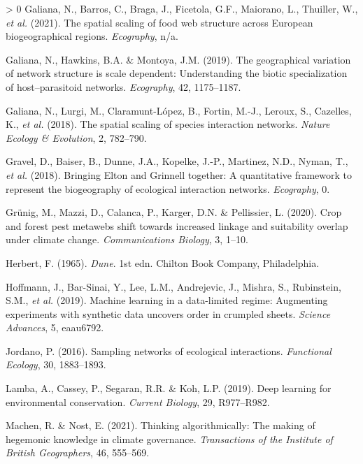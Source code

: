 \documentclass[11pt]{article}
\newlength{\cslhangindent}
\newenvironment{CSLReferences}[3] %
 {%
  \setlength{\parindent}{0pt}
  \ifodd #1 \everypar{\setlength{\hangindent}{\cslhangindent}}\ignorespaces\fi
  \ifnum #2 > 0
  \setlength{\parskip}{#2\baselineskip}
  \fi
 }%
 {}
\begin{document}
\begin{CSLReferences}{1}{0}
\leavevmode\hypertarget{ref-Galiana2021SpaSca}{}%
Galiana, N., Barros, C., Braga, J., Ficetola, G.F., Maiorano, L.,
Thuiller, W., \emph{et al.} (2021). The spatial scaling of food web
structure across European biogeographical regions. \emph{Ecography},
n/a.

\leavevmode\hypertarget{ref-Galiana2019GeoVar}{}%
Galiana, N., Hawkins, B.A. \& Montoya, J.M. (2019). The geographical
variation of network structure is scale dependent: Understanding the
biotic specialization of host--parasitoid networks. \emph{Ecography},
42, 1175--1187.

\leavevmode\hypertarget{ref-Galiana2018SpaSca}{}%
Galiana, N., Lurgi, M., Claramunt-López, B., Fortin, M.-J., Leroux, S.,
Cazelles, K., \emph{et al.} (2018). The spatial scaling of species
interaction networks. \emph{Nature Ecology \& Evolution}, 2, 782--790.

\leavevmode\hypertarget{ref-Gravel2018BriElt}{}%
Gravel, D., Baiser, B., Dunne, J.A., Kopelke, J.-P., Martinez, N.D.,
Nyman, T., \emph{et al.} (2018). Bringing Elton and Grinnell together: A
quantitative framework to represent the biogeography of ecological
interaction networks. \emph{Ecography}, 0.

\leavevmode\hypertarget{ref-Grunig2020CroFor}{}%
Grünig, M., Mazzi, D., Calanca, P., Karger, D.N. \& Pellissier, L.
(2020). Crop and forest pest metawebs shift towards increased linkage
and suitability overlap under climate change. \emph{Communications
Biology}, 3, 1--10.

\leavevmode\hypertarget{ref-Herbert1965Dun}{}%
Herbert, F. (1965). \emph{Dune}. 1st edn. Chilton Book Company,
Philadelphia.

\leavevmode\hypertarget{ref-Hoffmann2019MacLea}{}%
Hoffmann, J., Bar-Sinai, Y., Lee, L.M., Andrejevic, J., Mishra, S.,
Rubinstein, S.M., \emph{et al.} (2019). Machine learning in a
data-limited regime: Augmenting experiments with synthetic data uncovers
order in crumpled sheets. \emph{Science Advances}, 5, eaau6792.

\leavevmode\hypertarget{ref-Jordano2016SamNet}{}%
Jordano, P. (2016). Sampling networks of ecological interactions.
\emph{Functional Ecology}, 30, 1883--1893.

\leavevmode\hypertarget{ref-Lamba2019DeeLea}{}%
Lamba, A., Cassey, P., Segaran, R.R. \& Koh, L.P. (2019). Deep learning
for environmental conservation. \emph{Current Biology}, 29, R977--R982.

\leavevmode\hypertarget{ref-Machen2021ThiAlg}{}%
Machen, R. \& Nost, E. (2021). Thinking algorithmically: The making of
hegemonic knowledge in climate governance. \emph{Transactions of the
Institute of British Geographers}, 46, 555--569.


\end{CSLReferences}
\end{document}
